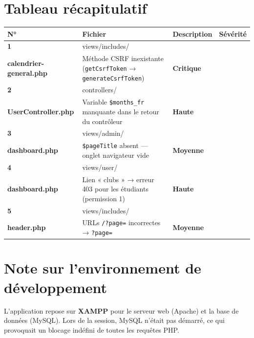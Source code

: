 \documentclass[12pt,a4paper]{article}
\begin{document}
\section{Tableau récapitulatif}

\begin{center}
\renewcommand{\arraystretch}{1.4}
\begin{tabularx}{\textwidth}{
    >{\bfseries}p{0.5cm}
    >{\ttfamily\small}p{4.5cm}
    X
    p{2.2cm}
}
\toprule
\textbf{N°} & \textbf{Fichier} & \textbf{Description} & \textbf{Sévérité} \\
\midrule
1 & views/includes/\\calendrier-general.php
  & Méthode CSRF inexistante (\texttt{getCsrfToken} → \texttt{generateCsrfToken})
  & \textcolor{danger}{\textbf{Critique}} \\
\midrule
2 & controllers/\\UserController.php
  & Variable \texttt{\$months\_fr} manquante dans le retour du contrôleur
  & \textcolor{warning!80!black}{\textbf{Haute}} \\
\midrule
3 & views/admin/\\dashboard.php
  & \texttt{\$pageTitle} absent — onglet navigateur vide
  & \textcolor{primary}{\textbf{Moyenne}} \\
\midrule
4 & views/user/\\dashboard.php
  & Lien « clubs » → erreur 403 pour les étudiants (permission 1)
  & \textcolor{warning!80!black}{\textbf{Haute}} \\
\midrule
5 & views/includes/\\header.php
  & URLs \texttt{/?page=} incorrectes → \texttt{?page=}
  & \textcolor{primary}{\textbf{Moyenne}} \\
\bottomrule
\end{tabularx}
\end{center}

\section{Note sur l'environnement de développement}

L'application repose sur \textbf{XAMPP} pour le serveur web (Apache) et la
base de données (MySQL). Lors de la session, MySQL n'était pas démarré, ce
qui provoquait un blocage indéfini de toutes les requêtes PHP.
\end{document}
